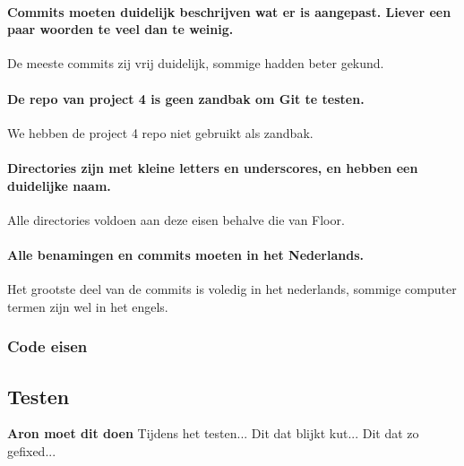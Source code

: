 \documentclass{article}
\begin{document}
	\paragraph{Commits moeten duidelijk beschrijven wat er is aangepast. Liever een paar woorden te veel dan te weinig.}
De meeste commits zij vrij duidelijk, sommige hadden beter gekund.
	\paragraph{De repo van project 4 is geen zandbak om Git te testen.}
We hebben de project 4 repo niet gebruikt als zandbak.
	\paragraph{Directories zijn met kleine letters en underscores, en hebben een duidelijke naam.}
Alle directories voldoen aan deze eisen behalve die van Floor.
	\paragraph{Alle benamingen en commits moeten in het Nederlands.}
Het grootste deel van de commits is voledig in het nederlands, sommige computer termen zijn wel in het engels.


\subsubsection{Code eisen}


\subsection{Testen}

\textbf{Aron moet dit doen}
Tijdens het testen...
Dit dat blijkt kut...
Dit dat zo gefixed...
\end{document}
